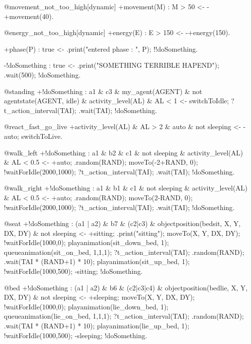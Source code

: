 \documentclass[draft,final]{vutinfth} %
\begin{document}
{@movement\_not\_too\_high[dynamic]
+movement(M) : M > 50
    <-  -+movement(40).

@energy\_not\_too\_high[dynamic]
+energy(E) : E > 150
    <-  -+energy(150).

+phase(P) : true
    <-  .print("entered phase : ", P);
        !!doSomething.

-!doSomething : true
    <-  .print("SOMETHING TERRIBLE HAPEND");
        .wait(500);
        !doSomething.

@standing
+!doSomething : a1 \& c3 \& my\_agent(AGENT) \& not agentstate(AGENT, idle) \& activity\_level(AL) \& AL < 1
    <-  switchToIdle;
        ?t\_action\_interval(TAI);
        .wait(TAI);
        !doSomething.

@react\_fast\_go\_live
+activity\_level(AL) \& AL > 2 \& auto \& not sleeping
    <-  -auto;
        switchToLive.

@walk\_left
+!doSomething : a1 \& b2 \& c1 \& not sleeping \& activity\_level(AL) \& AL < 0.5
    <-  +auto;
        .random(RAND);
        moveTo(-2+RAND, 0);
        !waitForIdle(2000,1000);
        ?t\_action\_interval(TAI);
        .wait(TAI);
        !doSomething.

@walk\_right
+!doSomething : a1 \& b1 \& c1 \& not sleeping \& activity\_level(AL) \& AL < 0.5
    <-  +auto;
        .random(RAND);
        moveTo(2-RAND, 0);
        !waitForIdle(2000,1000);
        ?t\_action\_interval(TAI);
        .wait(TAI);
        !doSomething.

@seat
+!doSomething : (a1 | a2) \& b7 \& (c2|c3) \& objectposition(bedsit, X, Y, DX, DY) \& not sleeping
    <-  +sitting;
        .print("sitting");
        moveTo(X, Y, DX, DY);
        !waitForIdle(1000,0);
        playanimation(sit\_down\_bed, 1);
        queueanimation(sit\_on\_bed, 1,1,1);
        ?t\_action\_interval(TAI);
        .random(RAND);
        .wait(TAI * (RAND+1) * 10);
        playanimation(sit\_up\_bed, 1);
        !waitForIdle(1000,500);
        -sitting;
        !doSomething.

@bed
+!doSomething : (a1 | a2) \& b6 \& (c2|c3|c4) \& objectposition(bedlie, X, Y, DX, DY) \& not sleeping
    <-  +sleeping;
        moveTo(X, Y, DX, DY);
        !waitForIdle(1000,0);
        playanimation(lie\_down\_bed, 1);
        queueanimation(lie\_on\_bed, 1,1,1);
        ?t\_action\_interval(TAI);
        .random(RAND);
        .wait(TAI * (RAND+1) * 10);
        playanimation(lie\_up\_bed, 1);
        !waitForIdle(1000,500);
        -sleeping;
        !doSomething.

}
\end{document}

